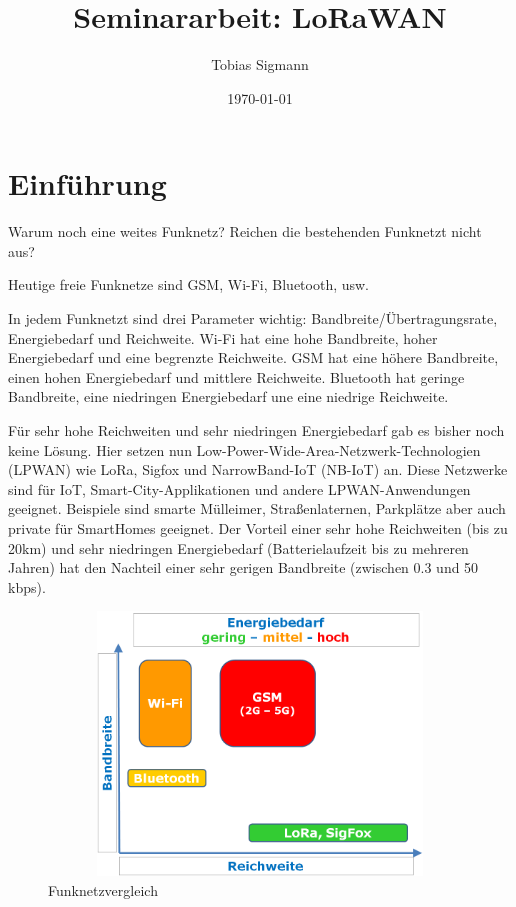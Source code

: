 \documentclass[a4paper, 12pt]{article}
\author{Tobias Sigmann}
\title{Seminararbeit: LoRaWAN}
\date{\today}
\begin{document}
    \maketitle
    \newpage
    \tableofcontents
    \newpage

    \section{Einführung}
        Warum noch eine weites Funknetz? 
        Reichen die bestehenden Funknetzt nicht aus?

        Heutige freie Funknetze sind GSM, Wi-Fi, Bluetooth, usw.
        
        In jedem Funknetzt sind drei Parameter wichtig: Bandbreite/Übertragungsrate, Energiebedarf und Reichweite.
        Wi-Fi hat eine hohe Bandbreite, hoher Energiebedarf und eine begrenzte Reichweite. 
        GSM hat eine höhere Bandbreite, einen hohen Energiebedarf und mittlere Reichweite.
        Bluetooth hat geringe Bandbreite, eine niedringen Energiebedarf une eine niedrige Reichweite.
        
        Für sehr hohe Reichweiten und sehr niedringen Energiebedarf gab es bisher noch keine Lösung.
        Hier setzen nun Low-­Power-Wide-Area-Netzwerk-Technologien
        (LPWAN) wie LoRa, Sigfox und NarrowBand-IoT (NB-IoT) an. Diese Netzwerke sind für IoT,
        Smart-City-Applikationen und andere LPWAN-Anwendungen geeignet.
        Beispiele sind smarte Mülleimer, Straßenlaternen, Parkplätze aber auch private für SmartHomes geeignet.
        Der Vorteil einer sehr hohe Reichweiten (bis zu 20km) und sehr niedringen Energiebedarf (Batterielaufzeit
        bis zu mehreren Jahren) hat den Nachteil einer sehr gerigen Bandbreite (zwischen 0.3 und 50 kbps). 


        \begin{figure}[h]
            \centering
            \includegraphics[width=13cm, height=7cm]{Einfuehrung}
            \caption{Funknetzvergleich}
        \end{figure}
\end{document}
